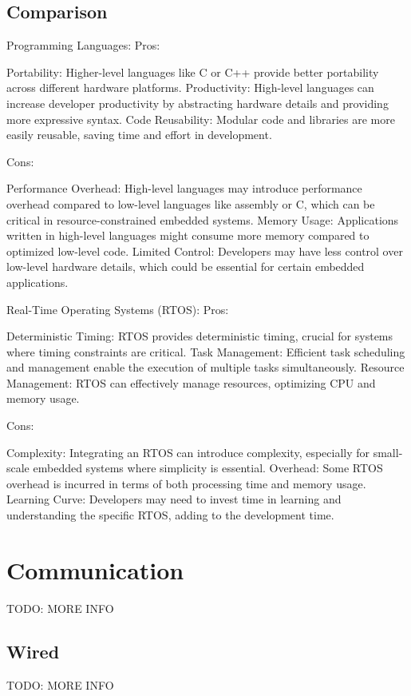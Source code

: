 \subsection{Comparison}
Programming Languages:
Pros:

Portability: Higher-level languages like C or C++ provide better portability across different hardware platforms.
Productivity: High-level languages can increase developer productivity by abstracting hardware details and providing more expressive syntax.
Code Reusability: Modular code and libraries are more easily reusable, saving time and effort in development.

Cons:

Performance Overhead: High-level languages may introduce performance overhead compared to low-level languages like assembly or C, which can be critical in resource-constrained embedded systems.
Memory Usage: Applications written in high-level languages might consume more memory compared to optimized low-level code.
Limited Control: Developers may have less control over low-level hardware details, which could be essential for certain embedded applications.

Real-Time Operating Systems (RTOS):
Pros:

Deterministic Timing: RTOS provides deterministic timing, crucial for systems where timing constraints are critical.
Task Management: Efficient task scheduling and management enable the execution of multiple tasks simultaneously.
Resource Management: RTOS can effectively manage resources, optimizing CPU and memory usage.

Cons:

Complexity: Integrating an RTOS can introduce complexity, especially for small-scale embedded systems where simplicity is essential.
Overhead: Some RTOS overhead is incurred in terms of both processing time and memory usage.
Learning Curve: Developers may need to invest time in learning and understanding the specific RTOS, adding to the development time.






\section{Communication}
TODO: MORE INFO\\
\subsection{Wired}
TODO: MORE INFO\\

